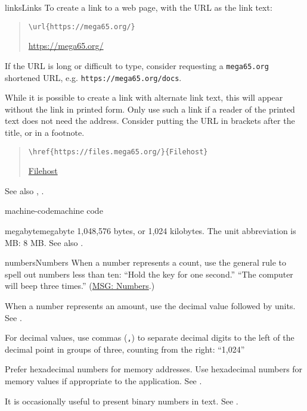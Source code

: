 \begin{sgentry}{links}{Links}
    To create a link to a web page, with the URL as the link text:

    \begin{quote}
        \texttt{{\textbackslash}url\{https://mega65.org/\}}

        \hrulefill

        \url{https://mega65.org/}
    \end{quote}

    If the URL is long or difficult to type, consider requesting a \texttt{mega65.org} shortened URL, e.g. \texttt{https://mega65.org/docs}.

    While it is possible to create a link with alternate link text, this will appear without the link in printed form. Only use such a link if a reader of the printed text does not need the address. Consider putting the URL in brackets after the title, or in a footnote.

    \begin{quote}
        \texttt{{\textbackslash}href\{https://files.mega65.org/\}\{Filehost\}}

        \hrulefill

        \href{https://files.mega65.org/}{Filehost}
    \end{quote}

    See also , .
\end{sgentry}

\begin{sgentry}{machine-code}{machine code}
\end{sgentry}

\begin{sgentry}{megabyte}{megabyte}
    1,048,576 bytes, or 1,024 kilobytes. The unit abbreviation is MB: 8 MB. See also .
\end{sgentry}

\begin{sgentry}{numbers}{Numbers}
    When a number represents a count, use the general rule to spell out numbers less than ten: ``Hold the key for one second.'' ``The computer will beep three times.'' (\href{https://learn.microsoft.com/en-us/style-guide/numbers}{MSG: Numbers}.)

    When a number represents an amount, use the decimal value followed by units. See .

    For decimal values, use commas (\texttt{,}) to separate decimal digits to the left of the decimal point in groups of three, counting from the right: ``1,024''

    Prefer hexadecimal numbers for memory addresses. Use hexadecimal numbers for memory values if appropriate to the application. See .

    It is occasionally useful to present binary numbers in text. See .
\end{sgentry}

